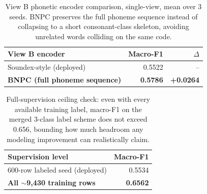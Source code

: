 \begin{table}[H]
\centering
\begin{tabular}{lrr}
\toprule
\textbf{View B encoder} & \textbf{Macro-F1} & \textbf{$\Delta$} \\
\midrule
Soundex-style (deployed)             & 0.5522 & -- \\
\textbf{BNPC (full phoneme sequence)} & \textbf{0.5786} & \textbf{+0.0264} \\
\bottomrule
\end{tabular}
\caption{View B phonetic encoder comparison, single-view, mean over 3
seeds. BNPC preserves the full phoneme sequence instead of collapsing to a
short consonant-class skeleton, avoiding unrelated words colliding on the
same code.}
\label{tab:bnpc-swap}
\end{table}

\begin{table}[H]
\centering
\begin{tabular}{lr}
\toprule
\textbf{Supervision level} & \textbf{Macro-F1} \\
\midrule
600-row labeled seed (deployed)         & 0.5534 \\
\textbf{All $\sim$9{,}430 training rows} & \textbf{0.6562} \\
\bottomrule
\end{tabular}
\caption{Full-supervision ceiling check: even with every available training
label, macro-F1 on the merged 3-class label scheme does not exceed 0.656,
bounding how much headroom any modeling improvement can realistically claim.}
\label{tab:supervision-ceiling}
\end{table}

